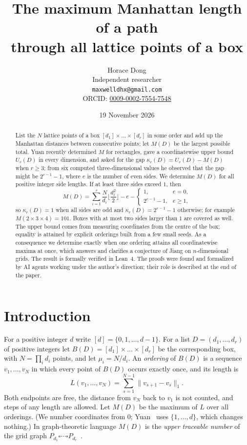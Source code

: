 \documentclass[11pt]{article}
\title{The maximum Manhattan length of a path\\ through all lattice points of a box}
\author{Horace Dong\\ \small Independent researcher\\
\small\texttt{maxwelldhx@gmail.com}\\
\small ORCID: \href{https://orcid.org/0009-0002-7554-7548}{0009-0002-7554-7548}}
\date{19 November 2026}
\theoremstyle{remark}
\begin{document}
\maketitle

\begin{abstract}
List the $N$ lattice points of a box $[d_1]\times\dots\times[d_r]$ in some
order and add up the Manhattan distances between consecutive points; let
$M(D)$ be the largest possible total. Yuan recently determined $M$ for
rectangles, gave a coordinatewise upper bound $U_r(D)$ in every dimension, and
asked for the gap $\kappa_r(D)=U_r(D)-M(D)$ when $r\ge3$; from six computed
three-dimensional values he observed that the gap might be $2^{e-1}-1$, where
$e$ is the number of even sides. We determine $M(D)$ for all positive integer
side lengths. If at least three sides exceed $1$, then
\[
M(D)=\sum_{i=1}^r\frac{N}{d_i}\Big\lfloor\frac{d_i^2}{2}\Big\rfloor-e-
\begin{cases}1,&e=0,\\ 2^{e-1}-1,&e\ge1,\end{cases}
\]
so $\kappa_r(D)=1$ when all sides are odd and $\kappa_r(D)=2^{e-1}-1$
otherwise; for example $M(2\times3\times4)=101$. Boxes with at most two sides
larger than $1$ are covered as well. The upper bound comes from measuring
coordinates from the centre of the box; equality is attained by explicit
orderings built from a few small seeds. As a consequence we determine exactly
when one ordering attains all coordinatewise maxima at once, which answers
and clarifies a conjecture of Jiang on $n$-dimensional grids. The result is
formally verified in Lean~4. The proofs were found and formalized by AI
agents working under the author's direction; their role is described at the
end of the paper.
\end{abstract}

\section{Introduction}

For a positive integer $d$ write $[d]=\{0,1,\dots,d-1\}$. For a list
$D=(d_1,\dots,d_r)$ of positive integers let $B(D)=[d_1]\times\dots\times[d_r]$
be the corresponding box, with $N=\prod_i d_i$ points, and let
$\mu_i=N/d_i$. An \emph{ordering} of $B(D)$ is a sequence $v_1,\dots,v_N$ in
which every point of $B(D)$ occurs exactly once, and its length is
\[
L(v_1,\dots,v_N)=\sum_{s=1}^{N-1}\|v_{s+1}-v_s\|_1 .
\]
Both endpoints are free, the distance from $v_N$ back to $v_1$ is not counted,
and steps of any length are allowed. Let $M(D)$ be the maximum of $L$ over all
orderings. (We number coordinates from $0$; Yuan~\cite{yuan} uses
$\{1,\dots,d\}$, which changes nothing.) In graph-theoretic language $M(D)$ is
the \emph{upper traceable number} of the grid graph
$P_{d_1}\square\cdots\square P_{d_r}$~\cite{osz,kkt}.
\end{document}
